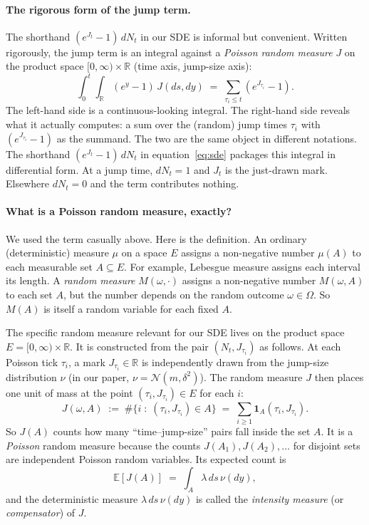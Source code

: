 \documentclass[11pt]{article}
\theoremstyle{definition}
\theoremstyle{remark}
\newcommand{\E}{\mathbb{E}}
\newcommand{\1}{\mathbf{1}}
\begin{document}
\paragraph{The rigorous form of the jump term.}
The shorthand $(e^{J_t} - 1)\,dN_t$ in our SDE is informal but convenient. Written rigorously, the jump term is an integral against a \emph{Poisson random measure} $J$ on the product space $[0,\infty) \times \mathbb{R}$ (time axis, jump-size axis):
\[
\int_0^t \int_{\mathbb{R}} (e^y - 1)\,J(ds, dy) \;=\; \sum_{\tau_i \le t}(e^{J_{\tau_i}} - 1).
\]
The left-hand side is a continuous-looking integral. The right-hand side reveals what it actually computes: a sum over the (random) jump times $\tau_i$ with $(e^{J_{\tau_i}} - 1)$ as the summand. The two are the same object in different notations. The shorthand $(e^{J_t}-1)\,dN_t$ in equation~\eqref{eq:sde} packages this integral in differential form. At a jump time, $dN_t = 1$ and $J_t$ is the just-drawn mark. Elsewhere $dN_t = 0$ and the term contributes nothing.

\paragraph{What is a Poisson random measure, exactly?}
We used the term casually above. Here is the definition. An ordinary (deterministic) measure $\mu$ on a space $E$ assigns a non-negative number $\mu(A)$ to each measurable set $A \subseteq E$. For example, Lebesgue measure assigns each interval its length. A \emph{random measure} $M(\omega, \cdot)$ assigns a non-negative number $M(\omega, A)$ to each set $A$, but the number depends on the random outcome $\omega \in \Omega$. So $M(A)$ is itself a random variable for each fixed $A$.

The specific random measure relevant for our SDE lives on the product space $E = [0, \infty) \times \mathbb{R}$. It is constructed from the pair $(N_t, J_{\tau_i})$ as follows. At each Poisson tick $\tau_i$, a mark $J_{\tau_i} \in \mathbb{R}$ is independently drawn from the jump-size distribution $\nu$ (in our paper, $\nu = \mathcal{N}(m, \delta^2)$). The random measure $J$ then places one unit of mass at the point $(\tau_i, J_{\tau_i}) \in E$ for each $i$:
\[
J(\omega, A) \;:=\; \#\big\{i \;:\; (\tau_i, J_{\tau_i}) \in A\big\} \;=\; \sum_{i \ge 1} \mathbf{1}_A(\tau_i, J_{\tau_i}).
\]
So $J(A)$ counts how many ``time--jump-size'' pairs fall inside the set $A$. It is a \emph{Poisson} random measure because the counts $J(A_1), J(A_2), \ldots$ for disjoint sets are independent Poisson random variables. Its expected count is
\[
\E[J(A)] \;=\; \int_A \lambda\,ds\,\nu(dy),
\]
and the deterministic measure $\lambda\,ds\,\nu(dy)$ is called the \emph{intensity measure} (or \emph{compensator}) of $J$.
\end{document}
